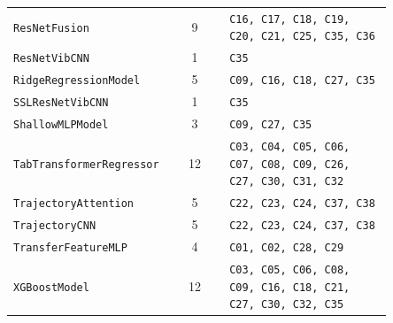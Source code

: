 \begin{longtable}{@{}p{0.42\linewidth}cp{0.43\linewidth}@{}}
\texttt{ResNetFusion} & 9 & \texttt{C16, C17, C18, C19, C20, C21, C25, C35, C36} \\
\texttt{ResNetVibCNN} & 1 & \texttt{C35} \\
\texttt{RidgeRegressionModel} & 5 & \texttt{C09, C16, C18, C27, C35} \\
\texttt{SSLResNetVibCNN} & 1 & \texttt{C35} \\
\texttt{ShallowMLPModel} & 3 & \texttt{C09, C27, C35} \\
\texttt{TabTransformerRegressor} & 12 & \texttt{C03, C04, C05, C06, C07, C08, C09, C26, C27, C30, C31, C32} \\
\texttt{TrajectoryAttention} & 5 & \texttt{C22, C23, C24, C37, C38} \\
\texttt{TrajectoryCNN} & 5 & \texttt{C22, C23, C24, C37, C38} \\
\texttt{TransferFeatureMLP} & 4 & \texttt{C01, C02, C28, C29} \\
\texttt{XGBoostModel} & 12 & \texttt{C03, C05, C06, C08, C09, C16, C18, C21, C27, C30, C32, C35} \\
\bottomrule
\end{longtable}

